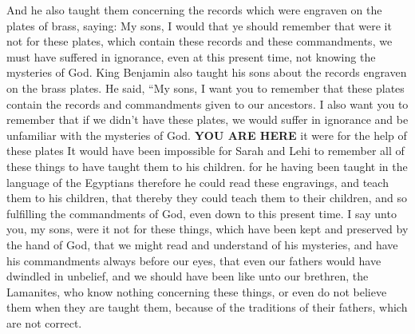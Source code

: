 \bverse \iffalse And he also taught them concerning the records which were engraven on the plates of brass, saying: My sons, I would that ye should remember that were it not for these plates, which contain these records and these commandments, we must have suffered in ignorance, even at this present time, not knowing the mysteries of God. \fi
And he also taught them concerning the records which were engraven on the plates of brass, saying: My sons, I would that ye should remember that were it not for these plates, which contain these records and these commandments, we must have suffered in ignorance, even at this present time, not knowing the mysteries of God.
King Benjamin also taught his sons about the records engraven on the brass plates. He said, ``My sons, I want you to remember that these plates contain the records and commandments given to our ancestors. I also want you to remember that if we didn't have these plates, we would suffer in ignorance and be unfamiliar with the mysteries of God.
\bverse \iffalse For it were not possible that our father, Lehi, could have remembered all these things, to have taught them to his children, except it were for the help of these plates; for he having been taught in the language of the Egyptians therefore he could read these engravings, and teach them to his children, that thereby they could teach them to their children, and so fulfilling the commandments of God, even down to this present time. \fi
\textbf{YOU ARE HERE}
it were for the help of these plates It would have been impossible for Sarah and Lehi to remember all of these things  to have taught them to his children. for he having been taught in the language of the Egyptians therefore he could read these engravings, and teach them to his children, that thereby they could teach them to their children, and so fulfilling the commandments of God, even down to this present time.
\bverse \iffalse I say unto you, my sons, were it not for these things, which have been kept and preserved by the hand of God, that we might read and understand of his mysteries, and have his commandments always before our eyes, that even our fathers would have dwindled in unbelief, and we should have been like unto our brethren, the Lamanites, who know nothing concerning these things, or even do not believe them when they are taught them, because of the traditions of their fathers, which are not correct. \fi
I say unto you, my sons, were it not for these things, which have been kept and preserved by the hand of God, that we might read and understand of his mysteries, and have his commandments always before our eyes, that even our fathers would have dwindled in unbelief, and we should have been like unto our brethren, the Lamanites, who know nothing concerning these things, or even do not believe them when they are taught them, because of the traditions of their fathers, which are not correct.
